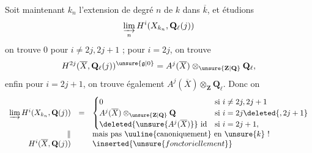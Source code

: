 Soit maintenant $k_n$ l'extension de degré $n$ de $k$ dans $\overline{k}$, et étudions
\[
\varinjlim_n H^i(X_{k_n},\mathbf{Q}_\ell(j))
\]
on trouve $0$ pour $i\ne2j,2j+1$ ; pour $i=2j$, on trouve
\[
H^{2j}(\overline{X},\mathbf{Q}_\ell(j))^{\unsure{\mathfrak{g}|0}}=A^j(\overline{X})\otimes_{\unsure{\mathbf{Z}|\mathbf{Q}}}\mathbf{Q}_\ell,
\]
enfin pour $i=2j+1$, on trouve également $A^j(\overline{X})\otimes_{\mathbf{Z}}\mathbf{Q}_\ell$.
Donc on  
\[
\begin{array}{rcl}
\varinjlim H^i(X_{k_n},\mathbf{Q}(j))&=&\begin{cases}
0&\text{si }i\ne2j,2j+1\\
A^j(\overline{X})\otimes_{\unsure{\mathbf{Z}|\mathbf{Q}}}\mathbf{Q}&\text{si }i=2j\deleted{,2j+1}\\
\deleted{\unsure{A^j(\overline{X})}}\ \mathrm{id}&\text{si }i=2j+1,
\end{cases}\\
\Vert&&\text{mais pas \uuline{canoniquement} en }\unsure{k}\ !\\
H^i(\overline{X},\mathbf{Q}(j))&&\inserted{\unsure{fonctoriellement}}
\end{array}
\]

